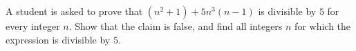 A student is asked to prove that $\left(n^2+1\right)+5n^3(n-1)$ is divisible by $5$ for every integer $n$. Show that the claim is false, and find all integers $n$ for which the expression is divisible by $5$.
